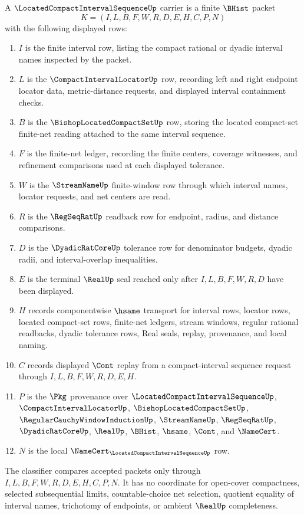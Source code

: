 \begin{definition}
\label{def:located-compact-interval-sequence-carrier}
A $\LocatedCompactIntervalSequenceUp$ carrier is a finite $\BHist$ packet
$$
K=(I,L,B,F,W,R,D,E,H,C,P,N)
$$
with the following displayed rows:
\begin{enumerate}
\item $I$ is the finite interval row, listing the compact rational or dyadic interval names inspected by the packet.
\item $L$ is the $\CompactIntervalLocatorUp$ row, recording left and right endpoint locator data, metric-distance requests, and displayed interval containment checks.
\item $B$ is the $\BishopLocatedCompactSetUp$ row, storing the located compact-set finite-net reading attached to the same interval sequence.
\item $F$ is the finite-net ledger, recording the finite centers, coverage witnesses, and refinement comparisons used at each displayed tolerance.
\item $W$ is the $\StreamNameUp$ finite-window row through which interval names, locator requests, and net centers are read.
\item $R$ is the $\RegSeqRatUp$ readback row for endpoint, radius, and distance comparisons.
\item $D$ is the $\DyadicRatCoreUp$ tolerance row for denominator budgets, dyadic radii, and interval-overlap inequalities.
\item $E$ is the terminal $\RealUp$ seal reached only after $I,L,B,F,W,R,D$ have been displayed.
\item $H$ records componentwise $\hsame$ transport for interval rows, locator rows, located compact-set rows, finite-net ledgers, stream windows, regular rational readbacks, dyadic tolerance rows, Real seals, replay, provenance, and local naming.
\item $C$ records displayed $\Cont$ replay from a compact-interval sequence request through $I,L,B,F,W,R,D,E,H$.
\item $P$ is the $\Pkg$ provenance over $\LocatedCompactIntervalSequenceUp$, $\CompactIntervalLocatorUp$, $\BishopLocatedCompactSetUp$, $\RegularCauchyWindowInductionUp$, $\StreamNameUp$, $\RegSeqRatUp$, $\DyadicRatCoreUp$, $\RealUp$, $\BHist$, $\hsame$, $\Cont$, and $\NameCert$.
\item $N$ is the local $\NameCert_{\LocatedCompactIntervalSequenceUp}$ row.
\end{enumerate}
The classifier compares accepted packets only through $I,L,B,F,W,R,D,E,H,C,P,N$. It has no coordinate for open-cover compactness, selected subsequential limits, countable-choice net selection, quotient equality of interval names, trichotomy of endpoints, or ambient $\RealUp$ completeness.
\end{definition}


